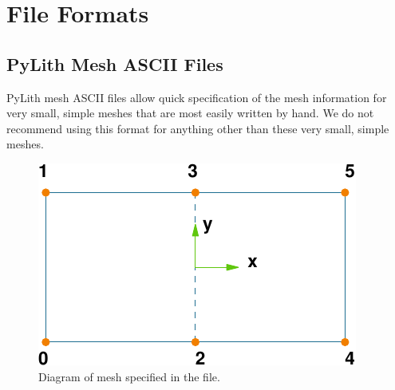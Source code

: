 \chapter{File Formats}
\label{cha:formats}

\section{PyLith Mesh ASCII Files}
\label{sec:format:MeshIOAscii}

PyLith mesh ASCII files allow quick specification of the mesh information
for very small, simple meshes that are most easily written by hand.
We do not recommend using this format for anything other than these
very small, simple meshes.

\begin{figure}[htbp]
  \includegraphics{fileformats/figs/meshquad4}
  \caption{Diagram of mesh specified in the  file.}
  \label{fig:meshioascii:diagram}
\end{figure}



